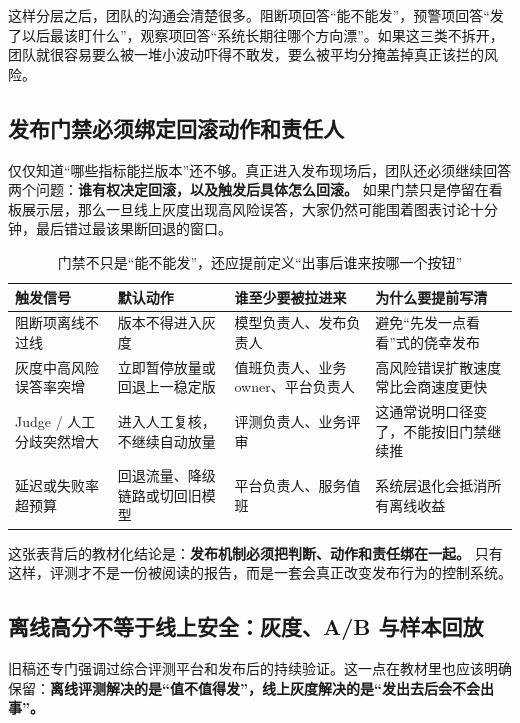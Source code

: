 这样分层之后，团队的沟通会清楚很多。阻断项回答“能不能发”，预警项回答“发了以后最该盯什么”，观察项回答“系统长期往哪个方向漂”。如果这三类不拆开，团队就很容易要么被一堆小波动吓得不敢发，要么被平均分掩盖掉真正该拦的风险。

\subsection{发布门禁必须绑定回滚动作和责任人}
仅仅知道“哪些指标能拦版本”还不够。真正进入发布现场后，团队还必须继续回答两个问题：\textbf{谁有权决定回滚，以及触发后具体怎么回滚。} 如果门禁只是停留在看板展示层，那么一旦线上灰度出现高风险误答，大家仍然可能围着图表讨论十分钟，最后错过最该果断回退的窗口。

\begin{table}[H]
\centering
\small
\begin{tabularx}{\textwidth}{>{\raggedright\arraybackslash}p{2.9cm}>{\raggedright\arraybackslash}p{3cm}>{\raggedright\arraybackslash}p{2.8cm}>{\raggedright\arraybackslash}X}
\toprule
\textbf{触发信号} & \textbf{默认动作} & \textbf{谁至少要被拉进来} & \textbf{为什么要提前写清} \\
\midrule
阻断项离线不过线 & 版本不得进入灰度 & 模型负责人、发布负责人 & 避免“先发一点看看”式的侥幸发布 \\
灰度中高风险误答率突增 & 立即暂停放量或回退上一稳定版 & 值班负责人、业务 owner、平台负责人 & 高风险错误扩散速度常比会商速度更快 \\
Judge / 人工分歧突然增大 & 进入人工复核，不继续自动放量 & 评测负责人、业务评审 & 这通常说明口径变了，不能按旧门禁继续推 \\
延迟或失败率超预算 & 回退流量、降级链路或切回旧模型 & 平台负责人、服务值班 & 系统层退化会抵消所有离线收益 \\
\bottomrule
\end{tabularx}
\caption{门禁不只是“能不能发”，还应提前定义“出事后谁来按哪一个按钮”}
\label{tab:gate-actions}
\end{table}

这张表背后的教材化结论是：\textbf{发布机制必须把判断、动作和责任绑在一起。} 只有这样，评测才不是一份被阅读的报告，而是一套会真正改变发布行为的控制系统。

\subsection{离线高分不等于线上安全：灰度、A/B 与样本回放}
旧稿还专门强调过综合评测平台和发布后的持续验证。这一点在教材里也应该明确保留：\textbf{离线评测解决的是“值不值得发”，线上灰度解决的是“发出去后会不会出事”。}

